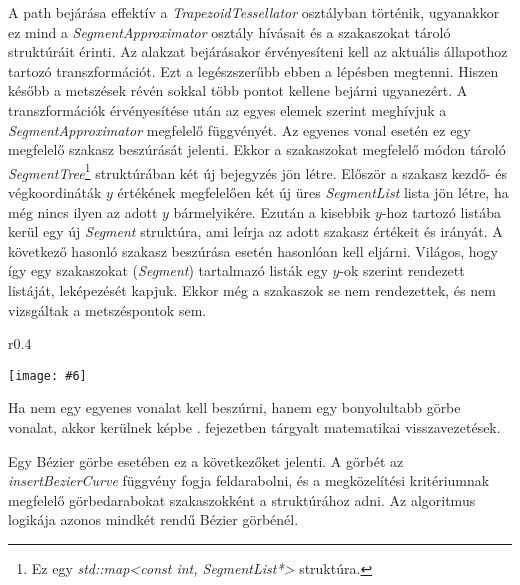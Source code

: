 \documentclass[12pt]{report}
\makeatletter
\theoremstyle{definition}
\newcommand{\func}[1]{{\textsl{#1}}}
\newcommand{\melyikoldalra}{r}
\newlength{\Xoffset}
\newlength{\Yoffset}
\newcommand*{\setpdfoffset}[2]{%
  \setlength{\Xoffset}{#1}%
  \setlength{\Yoffset}{#2}%
}
\newcommand*{\setviewport}[4]{%
  \def\x@viewport{%
    {\the\dimexpr#1-\Xoffset}
    {\the\dimexpr#2-\Yoffset}
    {\the\dimexpr#3-\Xoffset}
    {\the\dimexpr#4-\Yoffset}%
  }%
}
\newcommand{\includegraphicskivagas}[6]{
    \setpdfoffset{0pt}{0pt}
    \setviewport{#1}{#2}{#3}{#4}
    \texttt{[image: \#6]}
}
\newcommand{\includedataflowkivagas}[5]{
    \includegraphicskivagas{#1}{#2}{#3}{#4}{scale=0.6,#5}
    {img/built/dataflow_eps}
}
\makeatother
\begin{document}
A path bejárása effektív a \func{TrapezoidTessellator} osztályban történik,
ugyanakkor ez mind a \func{SegmentApproximator} osztály hívásait és a
szakaszokat tároló struktúráit érinti. Az alakzat bejárásakor érvényesíteni
kell az aktuális állapothoz tartozó transzformációt. Ezt a legészszerűbb ebben
a lépésben megtenni. Hiszen később a metszések révén sokkal több pontot kellene
bejárni ugyanezért. A transzformációk érvényesítése után az egyes elemek
szerint meghívjuk a \func{SegmentApproximator} megfelelő függvényét. Az egyenes
vonal esetén ez egy megfelelő szakasz beszúrását jelenti. Ekkor a szakaszokat
megfelelő módon tároló \func{SegmentTree}\footnote{Ez egy \func{std::map<const
int, SegmentList*>} struktúra.} struktúrában két új bejegyzés jön létre.
Először a szakasz kezdő- és végkoordináták $y$ értékének megfelelően két új
üres \func{SegmentList} lista jön létre, ha még nincs ilyen az adott $y$
bármelyikére. Ezután a kisebbik $y$-hoz tartozó listába kerül egy új
\func{Segment} struktúra, ami leírja az adott szakasz értékeit és irányát. A
következő hasonló szakasz beszúrása esetén hasonlóan kell eljárni. Világos,
hogy így egy szakaszokat (\func{Segment}) tartalmazó listák egy $y$-ok szerint
rendezett listáját, leképezését kapjuk. Ekkor még a szakaszok se nem
rendezettek, és nem vizsgáltak a metszéspontok sem.

  \begin{wrapfigure}{\melyikoldalra}{0.4\textwidth}
    \begin{center}
      \includedataflowkivagas{345pt}{400pt}{525pt}{590pt}{}
    \end{center}
    \caption{\label{fig:dataflow-segment} A szakasszá alakítás és a megközelítő
    visszavezetések \\ (Részlet az \emph{\ref{appendix:dataflow}.
    folyamatábrából}.)}
  \end{wrapfigure}

Ha nem egy egyenes vonalat kell beszúrni, hanem egy bonyolultabb görbe vonalat,
akkor kerülnek képbe . fejezetben tárgyalt matematikai
visszavezetések.

Egy Bézier görbe esetében ez a következőket jelenti. A görbét az
\func{insertBezierCurve} függvény fogja feldarabolni, és a megközelítési
kritériumnak megfelelő görbedarabokat szakaszokként a struktúrához adni. Az
algoritmus logikája azonos mindkét rendű Bézier görbénél.
\end{document}
